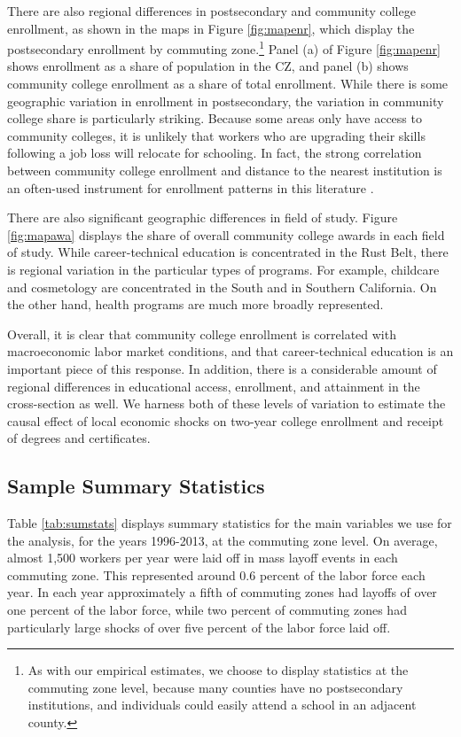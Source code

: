 There are also regional differences in postsecondary and community college enrollment, as shown in the maps in Figure \ref{fig:mapenr}, which display the postsecondary enrollment by commuting zone.\footnote{As with our empirical estimates, we choose to display statistics at the commuting zone level, because many counties have no postsecondary institutions, and individuals could easily attend a school in an adjacent county.} Panel (a) of Figure \ref{fig:mapenr} shows enrollment as a share of population in the CZ, and panel (b) shows community college enrollment as a share of total enrollment.  While there is some geographic variation in enrollment in postsecondary, the variation in community college share is particularly striking. Because some areas only have access to community colleges, it is unlikely that workers who are upgrading their skills following a job loss will relocate for schooling. In fact, the strong correlation between community college enrollment and distance to the nearest institution is an often-used instrument for enrollment patterns in this literature \citep{rouse1995, XJ2013,LK2009}.

There are also significant geographic differences in field of study. Figure \ref{fig:mapawa} displays the share of overall community college awards in each field of study. While career-technical education is concentrated in the Rust Belt, there is regional variation in the particular types of programs. For example, childcare and cosmetology are concentrated in the South and in Southern California. On the other hand, health programs are much more broadly represented.

Overall, it is clear that community college enrollment is correlated with macroeconomic labor market conditions, and that career-technical education is an important piece of this response. In addition, there is a considerable amount of regional differences in educational access, enrollment, and attainment in the cross-section as well. We harness both of these levels of variation to estimate the causal effect of local economic shocks on two-year college enrollment and receipt of degrees and certificates. 



\subsection{Sample Summary Statistics}
Table \ref{tab:sumstats} displays summary statistics for the main variables we use for the analysis, for the years 1996-2013, at the commuting zone level. On average, almost 1,500 workers per year were laid off in mass layoff events in each commuting  zone. This represented around 0.6 percent of the labor force each year. In each year approximately a fifth of commuting zones had layoffs of over one percent of the labor force, while two percent of commuting zones had particularly large shocks of over five percent of the labor force laid off. 

